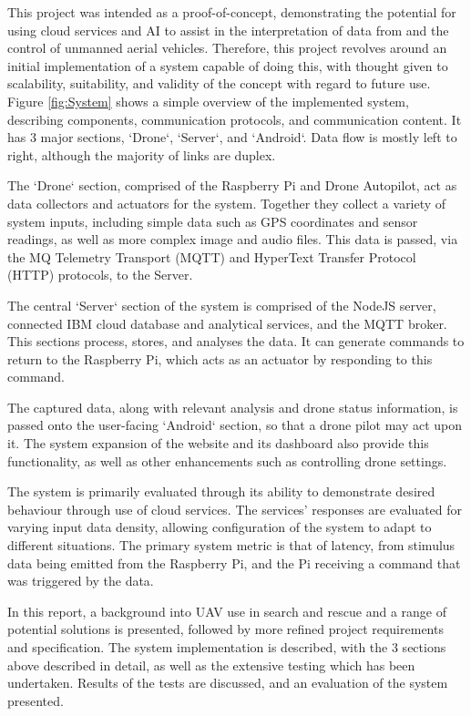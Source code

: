 \documentclass{article}
\begin{document}
This project was intended as a proof-of-concept, demonstrating the potential for using cloud services and AI to assist in the interpretation of data from and the control of unmanned aerial vehicles. Therefore, this project revolves around an initial implementation of a system capable of doing this, with thought given to scalability, suitability, and validity of the concept with regard to future use. Figure \ref{fig:System} shows a simple overview of the implemented system, describing components, communication protocols, and communication content. It has 3 major sections, `Drone`, `Server`, and `Android`. Data flow is mostly left to right, although the majority of links are duplex. 

The `Drone` section, comprised of the Raspberry Pi and Drone Autopilot, act as data collectors and actuators for the system. Together they collect a variety of system inputs, including simple data such as GPS coordinates and sensor readings, as well as more complex image and audio files. This data is passed, via the MQ Telemetry Transport (MQTT) and HyperText Transfer Protocol (HTTP) protocols, to the Server. 

The central `Server` section of the system is comprised of the NodeJS server, connected IBM cloud database and analytical services, and the MQTT broker. This sections process, stores, and analyses the data. It can generate commands to return to the Raspberry Pi, which acts as an actuator by responding to this command. 

The captured data, along with relevant analysis and drone status information, is passed onto the user-facing `Android` section, so that a drone pilot may act upon it. The system expansion of the website and its dashboard also provide this functionality, as well as other enhancements such as controlling drone settings.

The system is primarily evaluated through its ability to demonstrate desired behaviour through use of cloud services. The services' responses are evaluated for varying input data density, allowing configuration of the system to adapt to different situations. The primary system metric is that of latency, from stimulus data being emitted from the Raspberry Pi, and the Pi receiving a command that was triggered by the data. 

In this report, a background into UAV use in search and rescue and a range of potential solutions is presented, followed by more refined project requirements and specification. The system implementation is described, with the 3 sections above described in detail, as well as the extensive testing which has been undertaken. Results of the tests are discussed, and an evaluation of the system presented. 
\end{document}
